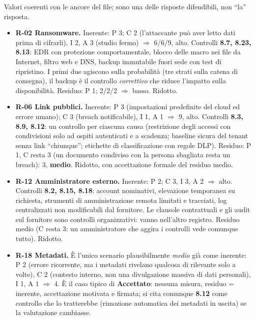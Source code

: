 \begin{integrazione}
Valori coerenti con le ancore del file; sono una delle risposte difendibili, non ``la'' risposta.
\begin{itemize}
  \item \textbf{R-02 Ransomware.} Inerente: P 3; C 2 (l'attaccante può aver letto dati prima di
    cifrarli), I 2, A 3 (studio fermo) $\Rightarrow$ 6/6/9, alto. Controlli \textbf{8.7, 8.23, 8.13}: EDR
    con protezione comportamentale, blocco delle macro nei file da Internet, filtro web e DNS, backup
    immutabile fuori sede con test di ripristino. I primi due agiscono sulla probabilità (tre strati sulla
    catena di consegna), il backup è il controllo \emph{correttivo} che riduce l'impatto sulla
    disponibilità. Residuo: P 1; 2/2/2 $\Rightarrow$ basso. Ridotto.
  \item \textbf{R-06 Link pubblici.} Inerente: P 3 (impostazioni predefinite del cloud ed errore umano);
    C 3 (breach notificabile), I 1, A 1 $\Rightarrow$ 9, alto. Controlli \textbf{8.3, 8.9, 8.12}: un
    controllo per ciascuna causa (restrizione degli accessi con condivisioni solo ad ospiti autenticati e a
    scadenza; baseline sicura del tenant senza link ``chiunque''; etichette di classificazione con regole DLP).
    Residuo: P 1, C resta 3 (un documento condiviso con la persona sbagliata resta un breach): 3,
    \textbf{medio}. Ridotto, con accettazione formale del residuo medio.
  \item \textbf{R-12 Amministratore esterno.} Inerente: P 2; C 3, I 3, A 2 $\Rightarrow$ alto. Controlli
    \textbf{8.2, 8.15, 8.18}: account nominativi, elevazione temporanea su richiesta, strumenti di
    amministrazione remota limitati e tracciati, log centralizzati non modificabili dal fornitore. Le
    clausole contrattuali e gli audit sul fornitore sono controlli organizzativi: vanno nell'altro registro.
    Residuo medio (C resta 3: un amministratore che aggira i controlli vede comunque tutto). Ridotto.
  \item \textbf{R-18 Metadati.} È l'unico scenario plausibilmente \emph{medio} già come inerente: P 2
    (errore ricorrente, ma i metadati rivelano qualcosa di rilevante solo a volte), C 2 (contesto interno,
    non una divulgazione massiva di dati personali), I 1, A 1 $\Rightarrow$ 4. È il caso tipico di
    \textbf{Accettato}: nessuna misura, residuo = inerente, accettazione motivata e firmata; si cita
    comunque \textbf{8.12} come controllo che lo tratterebbe (rimozione automatica dei metadati in uscita)
    se la valutazione cambiasse.
\end{itemize}
\end{integrazione}

